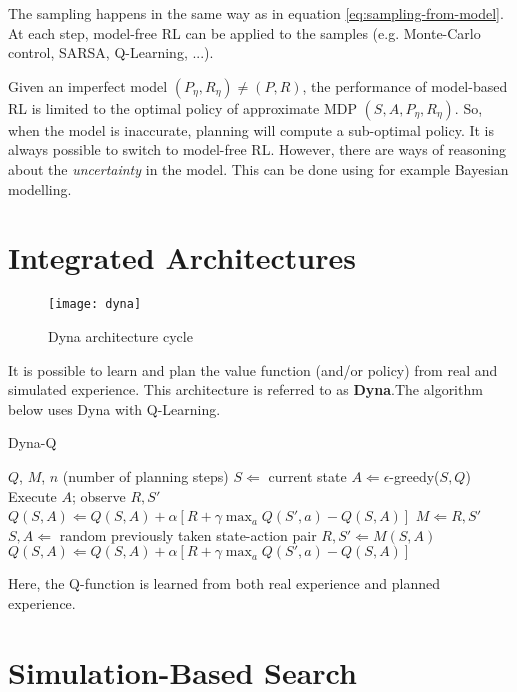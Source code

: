 The sampling happens in the same way as in equation \ref{eq:sampling-from-model}. At each step, model-free RL can be applied to the samples (e.g. Monte-Carlo control, SARSA, Q-Learning, ...).

Given an imperfect model $(P_\eta, R_\eta) \neq (P, R)$, the performance of model-based RL is limited to the optimal policy of approximate MDP $(S, A, P_\eta, R_\eta)$. So, when the model is inaccurate, planning will compute a sub-optimal policy. It is always possible to switch to model-free RL. However, there are ways of reasoning about the \textit{uncertainty} in the model. This can be done using for example Bayesian modelling.


\section{Integrated Architectures}

\begin{figure}[H]
	\centering
	\texttt{[image: dyna]}
	\caption{Dyna architecture cycle}
\end{figure}

It is possible to learn and plan the value function (and/or policy) from real and simulated experience. This architecture is referred to as \textbf{Dyna}.The algorithm below uses Dyna with Q-Learning.

\begin{algorithm}[H]
	\caption{Dyna-Q}
	\label{alg:Dyna-Q}
	\begin{algorithmic}
		\REQUIRE $Q$, $M$, $n$ (number of planning steps)
		\STATE $S \Leftarrow$ current state
		\STATE $A \Leftarrow \epsilon$-greedy($S, Q$)
		\STATE Execute $A$; observe $R, S'$
		\STATE $Q(S, A) \Leftarrow Q(S, A) + \alpha \left[R + \gamma \max_a Q(S', a) - Q(S, A)\right]$
		\STATE $M \Leftarrow R,S'$
			\STATE $S, A \Leftarrow$ random previously taken state-action pair
			\STATE $R, S' \Leftarrow M(S, A)$
			\STATE $Q(S, A) \Leftarrow Q(S, A) + \alpha \left[R + \gamma \max_a Q(S', a) - Q(S, A)\right]$
		\ENDFOR
	\end{algorithmic}
\end{algorithm}

Here, the Q-function is learned from both real experience and planned experience.

\section{Simulation-Based Search}

